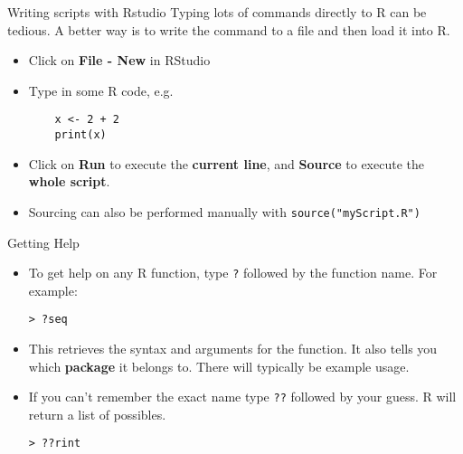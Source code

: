\documentclass{beamer}
\begin{document}
\begin{frame}{Writing scripts with Rstudio}
Typing lots of commands directly to R can be tedious. A better way is to write the command to a file and then load it into R.
        \begin{itemize}
            \item Click on \textbf{File - New} in RStudio
            \item Type in some R code, e.g.
        \begin{verbatim}
    x <- 2 + 2
    print(x)\end{verbatim}
        \item Click on \textbf{Run} to execute the \textbf{current line}, and \textbf{Source} to execute the \textbf{whole script}.
        \item Sourcing can also be performed manually with {\tt source("myScript.R")}
    \end{itemize}
\end{frame}

\begin{frame}{Getting Help}
    \begin{itemize}
        \item To get help on any R function, type {\tt ?} followed by the function name. For example:
        \begin{verbatim}
> ?seq
        \end{verbatim}
        \item This retrieves the syntax and arguments for the function. It also tells you which \textbf{package} it belongs to. There will typically be example usage.
        \item If you can't remember the exact name type {\tt ??} followed by your guess. R will return a list of possibles.
        \begin{verbatim}
> ??rint
        \end{verbatim}

    \end{itemize}
\end{frame}
\end{document}
